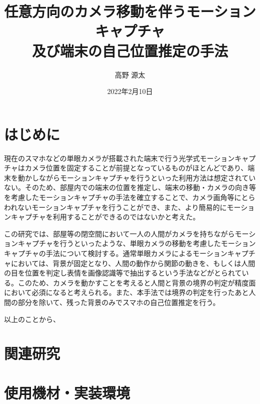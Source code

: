 \documentclass[11pt]{jreport}
\title{任意方向のカメラ移動を伴うモーションキャプチャ \\
        及び端末の自己位置推定の手法}
\author{高野 源太}
\date{2022年2月10日}	%
\begin{document}
\maketitle

\begin{abstract}


\end{abstract}

\tableofcontents



\newpage
{}	%



\chapter{はじめに}
現在のスマホなどの単眼カメラが搭載された端末で行う光学式モーションキャプチャはカメラ位置を固定することが前提となっているものがほとんどであり、端末を動かしながらモーションキャプチャを行うといった利用方法は想定されていない。そのため、部屋内での端末の位置を推定し、端末の移動・カメラの向き等を考慮したモーションキャプチャの手法を確立することで、カメラ画角等にとらわれないモーションキャプチャを行うことができ、また、より簡易的にモーションキャプチャを利用することができるのではないかと考えた。

この研究では、部屋等の閉空間において一人の人間がカメラを持ちながらモーションキャプチャを行うといったような、単眼カメラの移動を考慮したモーションキャプチャの手法について検討する。通常単眼カメラによるモーションキャプチャにおいては、背景が固定となり、人間の動作から関節の動きを、もしくは人間の目を位置を判定し表情を画像認識等で抽出するという手法などがとられている。このため、カメラを動かすことを考えると人間と背景の境界の判定が精度面において必須になると考えられる。また、本手法では境界の判定を行ったあと人間の部分を除いて、残った背景のみでスマホの自己位置推定を行う。

以上のことから、

\chapter{関連研究}


\chapter{使用機材・実装環境}
\end{document}
